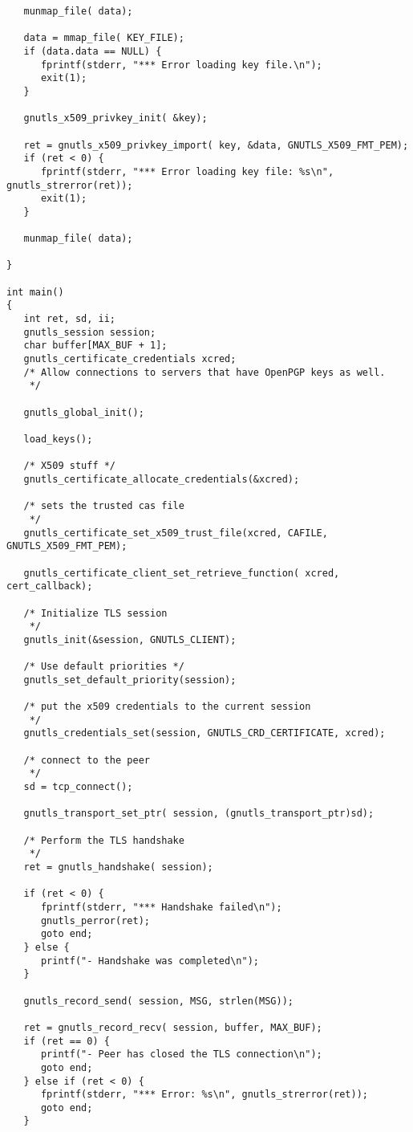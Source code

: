 \begin{verbatim}
   munmap_file( data);

   data = mmap_file( KEY_FILE);
   if (data.data == NULL) {
      fprintf(stderr, "*** Error loading key file.\n");
      exit(1);
   }

   gnutls_x509_privkey_init( &key);
   
   ret = gnutls_x509_privkey_import( key, &data, GNUTLS_X509_FMT_PEM);
   if (ret < 0) {
      fprintf(stderr, "*** Error loading key file: %s\n", gnutls_strerror(ret));
      exit(1);
   }

   munmap_file( data);
   
}

int main()
{
   int ret, sd, ii;
   gnutls_session session;
   char buffer[MAX_BUF + 1];
   gnutls_certificate_credentials xcred;
   /* Allow connections to servers that have OpenPGP keys as well.
    */

   gnutls_global_init();

   load_keys();

   /* X509 stuff */
   gnutls_certificate_allocate_credentials(&xcred);

   /* sets the trusted cas file
    */
   gnutls_certificate_set_x509_trust_file(xcred, CAFILE, GNUTLS_X509_FMT_PEM);

   gnutls_certificate_client_set_retrieve_function( xcred, cert_callback);
   
   /* Initialize TLS session 
    */
   gnutls_init(&session, GNUTLS_CLIENT);

   /* Use default priorities */
   gnutls_set_default_priority(session);

   /* put the x509 credentials to the current session
    */
   gnutls_credentials_set(session, GNUTLS_CRD_CERTIFICATE, xcred);

   /* connect to the peer
    */
   sd = tcp_connect();

   gnutls_transport_set_ptr( session, (gnutls_transport_ptr)sd);

   /* Perform the TLS handshake
    */
   ret = gnutls_handshake( session);

   if (ret < 0) {
      fprintf(stderr, "*** Handshake failed\n");
      gnutls_perror(ret);
      goto end;
   } else {
      printf("- Handshake was completed\n");
   }

   gnutls_record_send( session, MSG, strlen(MSG));

   ret = gnutls_record_recv( session, buffer, MAX_BUF);
   if (ret == 0) {
      printf("- Peer has closed the TLS connection\n");
      goto end;
   } else if (ret < 0) {
      fprintf(stderr, "*** Error: %s\n", gnutls_strerror(ret));
      goto end;
   }


\end{verbatim}
